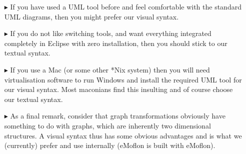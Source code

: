 \begin{itemize}

\item[$\blacktriangleright$] If you have used a UML tool before and feel comfortable with the standard UML diagrams, then you might prefer our visual syntax.

\item[$\blacktriangleright$] If you do not like switching tools, and want everything integrated completely in Eclipse with zero installation, then you should
stick to our textual syntax.

\item[$\blacktriangleright$] If you use a Mac (or some other *Nix system) then you will need virtualisation software to run Windows and install the required
UML tool for our visual syntax. Most maconians find this insulting and of course choose our textual syntax.

\item[$\blacktriangleright$] As a final remark, consider that graph transformations obviously have something to do with graphs, which are inherently two
dimensional structures. A visual syntax thus has some obvious advantages and is what we (currently) prefer and use internally (eMoflon is built with eMoflon).

\end{itemize}
